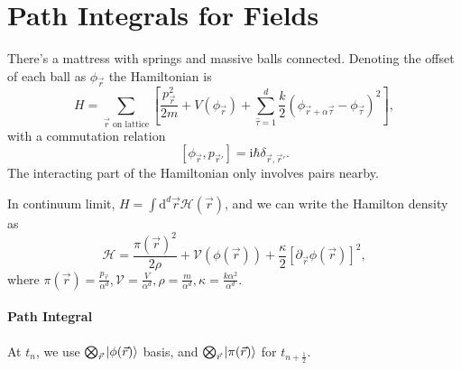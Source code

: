 \section{Path Integrals for Fields}
There's a mattress with springs and massive balls connected. Denoting the offset of each ball as $\phi_{\vec{r}}$ the Hamiltonian is
\begin{equation}
  H = \sum_{\vec{r} \text{ on lattice}}\left[ \frac{p_{\vec{r}}^2}{2m} + V(\phi_{\vec{r}}) + \sum_{\hat{\tau} = 1}^d \frac{k}{2}\left( \phi_{\vec{r} + \alpha \vec{\tau}}  - \phi_{\vec{\tau}}\right)^2  \right] ,
\end{equation}
with a commutation relation 
\begin{equation}
  \left[ \phi_{\vec{r}}, p_{\vec{r}'} \right]  = \mathrm{i}  \hbar \delta_{\vec{r},\vec{r}'}.
\end{equation}
The interacting part of the Hamiltonian only involves pairs nearby.

In continuum limit, $\displaystyle H = \int \mathrm{d} ^{d}\vec{r} \mathcal{H}(\vec{r})$, and we can write the Hamilton density as
\begin{equation}
  \mathcal{H}  = \frac{\pi(\vec{r})^2}{2\rho} + \mathcal{V} (\phi(\vec{r})) + \frac{\kappa}{2} \left[ \partial_{\vec{r}} \phi(\vec{r}) \right] ^2,
\end{equation}
where $\displaystyle \pi(\vec{r}) = \frac{p_{\vec{r}}}{\alpha^d}, \mathcal{V} = \frac{V}{\alpha^d}, \rho = \frac{m}{\alpha^d}, \kappa = \frac{k\alpha^2}{\alpha^d}$.

\paragraph{Path Integral}
At $t_n$, we use $\bigotimes_{\vec{r}} \ket{\phi(\vec{r})} $ basis, and $\bigotimes_{\vec{r}} \ket{\pi(\vec{r})} $ for $t_{n + \frac{1}{2}}$. 

